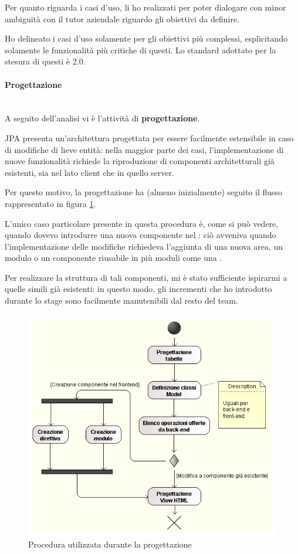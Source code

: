 Per quanto riguarda i casi d'uso, li ho realizzati per poter dialogare con
minor ambiguità con il tutor aziendale riguardo gli obiettivi da
definire.

Ho delineato i casi d'uso solamente per gli obiettivi più complessi,
esplicitando solamente le funzionalità più critiche di questi. Lo standard
adottato per la stesura di questi è  2.0.

\paragraph{Progettazione} \mbox{} \\

A seguito dell'analisi vi è l'attività di \textbf{progettazione}.

JPA presenta un'architettura progettata per essere facilmente estensibile in
caso di modifiche di lieve entità: nella maggior parte dei casi,
l'implementazione di nuove funzionalità richiede la riproduzione di componenti
architetturali già esistenti, sia nel lato client che in quello server.

Per questo motivo, la progettazione ha (almeno inizialmente) seguito il flusso
rappresentato in figura \ref{fig:progettazione}.

L'unico caso particolare presente in questa procedura è, come si può vedere,
quando dovevo introdurre una nuova componente nel \FREND{}: ciò avveniva quando
l'implementazione delle modifiche richiedeva l'aggiunta di una nuova area, un
modulo o un componente riusabile in più moduli come una .

Per realizzare la struttura di tali componenti, mi è stato sufficiente
ispirarmi a quelle simili già esistenti: in questo modo, gli incrementi
che ho introdotto durante lo stage sono facilmente manutenibili dal resto del
team.

\begin{figure}%
\centering
\includegraphics[width=.8\columnwidth]{immagini/progettazione}
\caption{Procedura utilizzata durante la progettazione}
\label{fig:progettazione}%
\end{figure}


